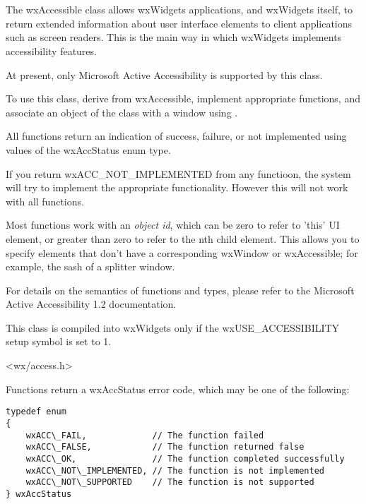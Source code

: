 %
%

\section{}\label{wxaccessible}

The wxAccessible class allows wxWidgets applications, and
wxWidgets itself, to return extended information about user interface elements
to client applications such as screen readers. This is the
main way in which wxWidgets implements accessibility features.

At present, only Microsoft Active Accessibility is supported
by this class.

To use this class, derive from wxAccessible, implement appropriate
functions, and associate an object of the class with a
window using .

All functions return an indication of success, failure, or not implemented
using values of the wxAccStatus enum type.

If you return wxACC\_NOT\_IMPLEMENTED from any functioon, the system will try to
implement the appropriate functionality. However this will not work with
all functions.

Most functions work with an {\it object id}, which can be zero to refer to
'this' UI element, or greater than zero to refer to the nth child element.
This allows you to specify elements that don't have a corresponding wxWindow or
wxAccessible; for example, the sash of a splitter window.

For details on the semantics of functions and types, please refer to the
Microsoft Active Accessibility 1.2 documentation.

This class is compiled into wxWidgets only if the wxUSE\_ACCESSIBILITY setup
symbol is set to 1.




<wx/access.h>


Functions return a wxAccStatus error code, which
may be one of the following:

{\small 
\begin{verbatim}
typedef enum
{
    wxACC\_FAIL,             // The function failed
    wxACC\_FALSE,            // The function returned false
    wxACC\_OK,               // The function completed successfully
    wxACC\_NOT\_IMPLEMENTED, // The function is not implemented
    wxACC\_NOT\_SUPPORTED    // The function is not supported
} wxAccStatus
\end{verbatim}
}

